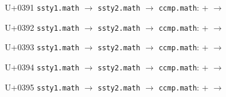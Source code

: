 \documentclass{article}
\begin{document}
\begin{substitutions}

U+0391  \linebreak
    \texttt{ssty1.math} $\to$  \linebreak
    \texttt{ssty2.math} $\to$  \linebreak
\texttt{ccmp.math}:
\linebreak\null\quad{} \space +  \space $\to$  

\goodbreak

U+0392  \linebreak
    \texttt{ssty1.math} $\to$  \linebreak
    \texttt{ssty2.math} $\to$  \linebreak
\texttt{ccmp.math}:
\linebreak\null\quad{} \space +  \space $\to$  

\goodbreak

U+0393  \linebreak
    \texttt{ssty1.math} $\to$  \linebreak
    \texttt{ssty2.math} $\to$  \linebreak
\texttt{ccmp.math}:
\linebreak\null\quad{} \space +  \space $\to$  

\goodbreak

U+0394  \linebreak
    \texttt{ssty1.math} $\to$  \linebreak
    \texttt{ssty2.math} $\to$  \linebreak
\texttt{ccmp.math}:
\linebreak\null\quad{} \space +  \space $\to$  

\goodbreak

U+0395  \linebreak
    \texttt{ssty1.math} $\to$  \linebreak
    \texttt{ssty2.math} $\to$  \linebreak
\texttt{ccmp.math}:
\linebreak\null\quad{} \space +  \space $\to$  


\end{substitutions}
\end{document}
